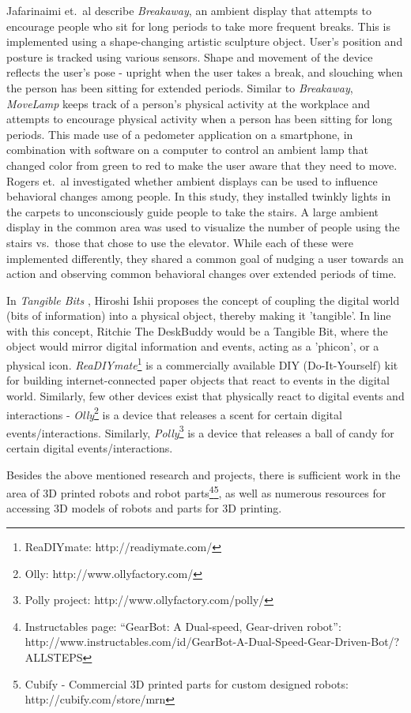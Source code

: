 \documentclass{sigchi-ext}
\begin{document}
Jafarinaimi et.\ al \cite{jafarinaimi2005breakaway} describe
\textit{Breakaway}, an ambient display that attempts to encourage people who
sit for long periods to take more frequent breaks. This is implemented using a
shape-changing artistic sculpture object. User's position and posture is
tracked using various sensors. Shape and movement of the device reflects the
user's pose - upright when the user takes a break, and slouching when the
person has been sitting for extended periods. Similar to \textit{Breakaway},
\textit{MoveLamp} \cite{fortmann2013make} keeps track of a person's physical
activity at the workplace and attempts to encourage physical activity when a
person has been sitting for long periods. This made use of a pedometer
application on a smartphone, in combination with software on a computer to
control an ambient lamp that changed color from green to red to make the user
aware that they need to move. Rogers et.\ al \cite{rogers2010ambient}
investigated whether ambient displays can be used to influence behavioral
changes among people. In this study, they installed twinkly lights in the
carpets to unconsciously guide people to take the stairs. A large ambient
display in the common area was used to visualize the number of people using the
stairs vs.\ those that chose to use the elevator. While each of these were
implemented differently, they shared a common goal of nudging a user towards an
action and observing common behavioral changes over extended periods of time.

In \textit{Tangible Bits} \cite{ishii1997tangible}, Hiroshi Ishii proposes the
concept of coupling the digital world (bits of information) into a physical
object, thereby making it 'tangible'. In line with this concept, Ritchie The
DeskBuddy would be a Tangible Bit, where the object would mirror digital
information and events, acting as a 'phicon', or a physical icon.
\textit{ReaDIYmate}\footnote{ReaDIYmate: http://readiymate.com/} is a
commercially available DIY (Do-It-Yourself) kit for building internet-connected
paper objects that react to events in the digital world.  Similarly, few other
devices exist that physically react to digital events and interactions -
\textit{Olly}\footnote{Olly: http://www.ollyfactory.com/} is a device that
releases a scent for certain digital events/interactions. Similarly,
\textit{Polly}\footnote{Polly project: http://www.ollyfactory.com/polly/} is a
device that releases a ball of candy for certain digital events/interactions.

Besides the above mentioned research and projects, there is sufficient work in
the area of 3D printed robots and robot parts\cite{megaro2015interactive,
schulz2015interactive}\footnote{Instructables page: ``GearBot: A Dual-speed,
Gear-driven robot'':
http://www.instructables.com/id/GearBot-A-Dual-Speed-Gear-Driven-Bot/?ALLSTEPS}\footnote{Cubify
- Commercial 3D printed parts for custom designed robots:
http://cubify.com/store/mrn}, as well as numerous resources for accessing 3D
models of robots and parts for 3D printing.
\end{document}
